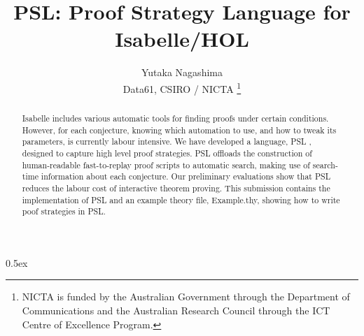 \documentclass[11pt,a4paper]{article}
\begin{document}
\title{PSL: Proof Strategy Language for Isabelle/HOL}
\author{Yutaka Nagashima \\
  Data61, CSIRO / NICTA
  \footnote{NICTA is funded by the Australian Government through the Department
  of Communications and the Australian Research Council through the
  ICT Centre of Excellence Program.}
}
\maketitle

\begin{abstract}
Isabelle includes various automatic tools for finding proofs under certain conditions. 
However, for each conjecture, knowing which automation to use, and how to tweak its parameters, 
is currently labour intensive. 
We have developed a language, PSL \cite{DBLP:journals/corr/NagashimaK16},
designed to capture high level proof strategies.
PSL offloads the construction of human-readable fast-to-replay proof scripts to automatic search, 
making use of search-time information about each conjecture. 
Our preliminary evaluations show that 
PSL reduces the labour cost of interactive theorem proving.
This submission contains the implementation of PSL and an example theory file,
Example.thy, showing how to write poof strategies in PSL.
\end{abstract}


\parindent 0pt\parskip 0.5ex

%



\end{document}
